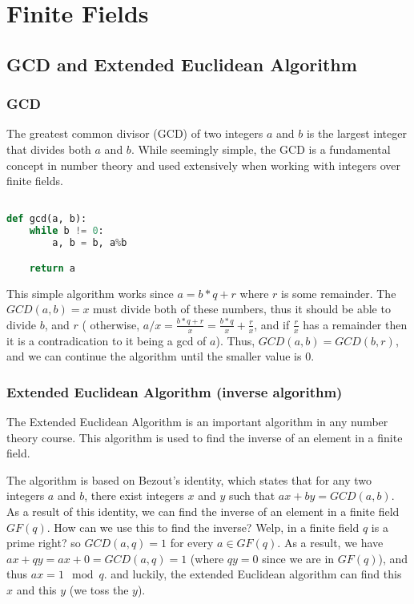 

\chapter{Finite Fields}\label{finite-fields}
\section{GCD and Extended Euclidean Algorithm}

\subsection{GCD}
The greatest common divisor (GCD) of two integers
 $a$ and $b$ is the largest integer that divides both $a$ and $b$.
 While seemingly simple, the GCD is a fundamental concept in number theory
 and used extensively when working with integers over finite fields.


 \begin{lstlisting}[language=Python,
  caption={GCD algorithm in python}
]

def gcd(a, b):
    while b != 0:
        a, b = b, a%b

    return a

 \end{lstlisting}

This simple algorithm works since 
$a=b*q+r$ where $r$ is some remainder. The $GCD(a,b)=x$
must divide both of these numbers, thus it should be able to divide $b$, and $r$ (
otherwise, $a/x = \frac{b*q+r}{x}=\frac{b*q}{x}+\frac{r}{x}$, and if $\frac{r}{x}$ has a remainder 
then it is a contradication to it being a gcd of $a$).
Thus, $GCD(a,b)=GCD(b,r)$, and we can continue the algorithm until the smaller 
value is $0$.


\subsection{Extended Euclidean Algorithm (inverse algorithm)}
\label{sec:finite-field:extended-euclidean}
The Extended Euclidean Algorithm is an important algorithm in any number theory course.
This algorithm is used to find the inverse of an element in a finite field.

The algorithm is based on Bezout's identity, which states
that for any two integers $a$ and $b$, there exist integers $x$ and $y$ such that
$ax+by=GCD(a,b)$. As a result of this identity, we can find the inverse of an element
in a finite field $GF(q)$. How can we use this to find the inverse?
Welp, in a finite field $q$ is a prime right? so $GCD(a,q)=1$ for every $a\in GF(q)$.
As a result, we have $ax+qy=ax+0=GCD(a,q)=1$ (where $qy=0$ since we are in $GF(q)$), and thus $ax=1 \mod q$. and luckily, the 
extended Euclidean algorithm can find this $x$ and this $y$ (we toss the $y$).


